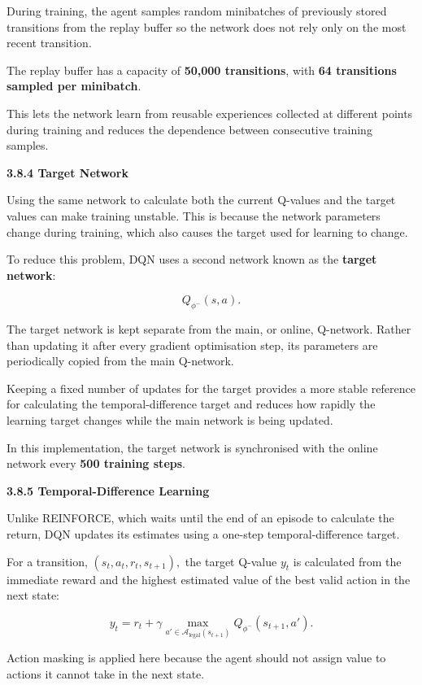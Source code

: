 During training, the agent samples random minibatches of previously
stored transitions from the replay buffer so the network does not rely
only on the most recent transition.

The replay buffer has a capacity of \textbf{50,000 transitions}, with
\textbf{64 transitions sampled per minibatch}.

This lets the network learn from reusable experiences collected at
different points during training and reduces the dependence between
consecutive training samples.

\textbf{3.8.4 Target Network}

Using the same network to calculate both the current Q-values and the
target values can make training unstable. This is because the network
parameters change during training, which also causes the target used for
learning to change.

To reduce this problem, DQN uses a second network known as the
\textbf{target network}:

\[Q_{\phi^{-}}(s,a).\]

The target network is kept separate from the main, or online, Q-network.
Rather than updating it after every gradient optimisation step, its
parameters are periodically copied from the main Q-network.

Keeping a fixed number of updates for the target provides a more stable
reference for calculating the temporal-difference target and reduces how
rapidly the learning target changes while the main network is being
updated.

In this implementation, the target network is synchronised with the
online network every \textbf{500 training steps}.

\textbf{3.8.5 Temporal-Difference Learning}

Unlike REINFORCE, which waits until the end of an episode to calculate
the return, DQN updates its estimates using a one-step
temporal-difference target.

For a transition, \(\left( s_{t},a_{t},r_{t},s_{t + 1} \right),\) the
target Q-value \(y_{t}\) is calculated from the immediate reward and the
highest estimated value of the best valid action in the next state:

\[y_{t} = r_{t} + \gamma\max_{a' \in \mathcal{A}_{\text{legal}}\left( s_{t + 1} \right)}{Q_{\phi^{-}}\left( s_{t + 1},a' \right)}.\]

Action masking is applied here because the agent should not assign value
to actions it cannot take in the next state.

